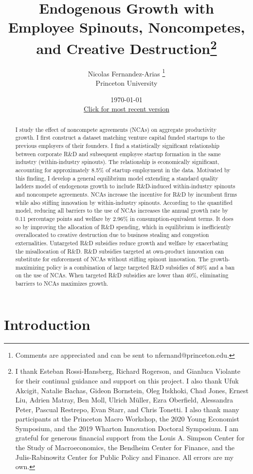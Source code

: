\documentclass[11pt,english]{article}
\title{Endogenous Growth with Employee Spinouts, Noncompetes, and Creative Destruction\thanks{I thank Esteban Rossi-Hansberg, Richard Rogerson, and Gianluca Violante for their continual guidance and support on this project. I also thank Ufuk Akcigit, Natalie Bachas, Gideon Bornstein, Oleg Itskhoki, Chad Jones, Ernest Liu, Adrien Matray, Ben Moll, Ulrich M\"uller, Ezra Oberfield, Alessandra Peter, Pascual Restrepo, Evan Starr, and Chris Tonetti. I also thank many participants at the Princeton Macro Workshop, the 2020 Young Economist Symposium, and the 2019 Wharton Innovation Doctoral Symposium. I am grateful for generous financial support from the Louis A. Simpson Center for the Study of Macroeconomics, the Bendheim Center for Finance, and the Julis-Rabinowitz Center for Public Policy and Finance. All errors are my own.}}
\author{Nicolas Fernandez-Arias \thanks{Comments are appreciated and can be sent to nfernand@princeton.edu.}\\ Princeton University}
\date{\today \\ \small
	\href{https://drive.google.com/file/d/17bZL7-AUJKllRb78r9fIkZscnNdJwo1G/view?usp=sharing}{Click for most recent version}}
\theoremstyle{definition}
\begin{document}
\begin{titlepage}
	\maketitle
	
	
	\begin{abstract}
		I study the effect of noncompete agreements (NCAs) on aggregate productivity growth. I first construct a dataset matching venture capital funded startups to the previous employers of their founders. I find a statistically significant relationship between corporate R\&D and subsequent employee startup formation in the same industry (within-industry spinouts). The relationship is economically significant, accounting for approximately 8.5\% of startup employment in the data. Motivated by this finding, I develop a general equilibrium model extending a standard quality ladders model of endogenous growth to include R\&D-induced within-industry spinouts and noncompete agreements. NCAs increase the incentive for R\&D by incumbent firms while also stifling innovation by within-industry spinouts. According to the quantified model, reducing all barriers to the use of NCAs increases the annual growth rate by 0.11 percentage points and welfare by 2.96\% in consumption-equivalent terms. It does so by improving the allocation of R\&D spending, which in equilibrium is inefficiently overallocated to creative destruction due to business stealing and congestion externalities. Untargeted R\&D subsidies reduce growth and welfare by exacerbating the misallocation of R\&D. R\&D subsidies targeted at own-product innovation can substitute for enforcement of NCAs without stifling spinout innovation. The growth-maximizing policy is a combination of large targeted R\&D subsidies of 80\% and a ban on the use of NCAs. When targeted R\&D subsidies are lower than 40\%, eliminating barriers to NCAs maximizes growth.
	\end{abstract}
\end{titlepage}






\section{Introduction}
\end{document}
